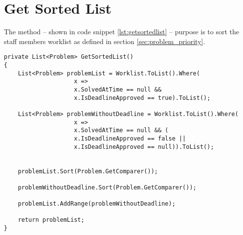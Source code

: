 \section{Get Sorted List}
\label{sec:getsortedlist}



The  method -- shown in code snippet \ref{lst:getsortedlist} -- purpose is to sort the staff members worklist as defined in section \ref{sec:problem_priority}. 


\begin{lstlisting}[style=sourceCode, caption=\myCaption{The GetSortedList method}, label=lst:getsortedlist,float=h]
private List<Problem> GetSortedList()
{
    List<Problem> problemList = Worklist.ToList().Where(
    				x => 
					x.SolvedAtTime == null && 
					x.IsDeadlineApproved == true).ToList();

    List<Problem> problemWithoutDeadline = Worklist.ToList().Where(
    				x =>
					x.SolvedAtTime == null && (
					x.IsDeadlineApproved == false || 
					x.IsDeadlineApproved == null)).ToList();


    problemList.Sort(Problem.GetComparer());

    problemWithoutDeadline.Sort(Problem.GetComparer());

    problemList.AddRange(problemWithoutDeadline);

    return problemList;
}
\end{lstlisting}
